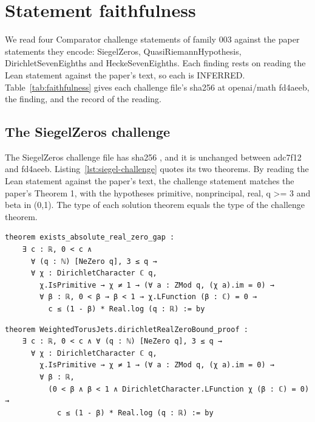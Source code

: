 \section{Statement faithfulness}\label{sec:faithfulness}

We read four Comparator challenge statements of family 003 against the paper statements they encode: SiegelZeros, QuasiRiemannHypothesis, DirichletSevenEighths and HeckeSevenEighths. %
Each finding rests on reading the Lean statement against the paper's text, so each is INFERRED. %
Table~\ref{tab:faithfulness} gives each challenge file's sha256 at openai/math fd4aeeb, the finding, and the record of the reading. %

\subsection{The SiegelZeros challenge}

The SiegelZeros challenge file has sha256 , and it is unchanged between adc7f12 and fd4aeeb. %
Listing~\ref{lst:siegel-challenge} quotes its two theorems. %
By reading the Lean statement against the paper's text, the challenge statement matches the paper's Theorem 1, with the hypotheses primitive, nonprincipal, real, q >= 3 and beta in (0,1). %
The type of each solution theorem equals the type of the challenge theorem. %

\begin{listing}[tbp]
\caption{The SiegelZeros challenge, lean/ComparatorChallenges/SiegelZeros.lean:8-14 and 19-25 (openai/math fd4aeeb; file sha256 bedaac02\ldots, unchanged since adc7f12).}\label{lst:siegel-challenge} %
\begin{Verbatim}
theorem exists_absolute_real_zero_gap :
    ∃ c : ℝ, 0 < c ∧
      ∀ (q : ℕ) [NeZero q], 3 ≤ q →
      ∀ χ : DirichletCharacter ℂ q,
        χ.IsPrimitive → χ ≠ 1 → (∀ a : ZMod q, (χ a).im = 0) →
        ∀ β : ℝ, 0 < β → β < 1 → χ.LFunction (β : ℂ) = 0 →
          c ≤ (1 - β) * Real.log (q : ℝ) := by
\end{Verbatim}
\begin{Verbatim}
theorem WeightedTorusJets.dirichletRealZeroBound_proof :
    ∃ c : ℝ, 0 < c ∧ ∀ (q : ℕ) [NeZero q], 3 ≤ q →
      ∀ χ : DirichletCharacter ℂ q,
        χ.IsPrimitive → χ ≠ 1 → (∀ a : ZMod q, (χ a).im = 0) →
        ∀ β : ℝ,
          (0 < β ∧ β < 1 ∧ DirichletCharacter.LFunction χ (β : ℂ) = 0) →
            c ≤ (1 - β) * Real.log (q : ℝ) := by
\end{Verbatim}
\end{listing}

